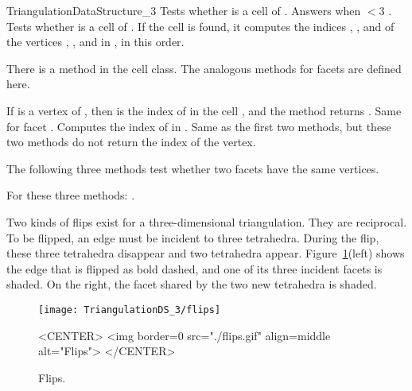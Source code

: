 \begin{ccRefConcept}{TriangulationDataStructure_3}
{Tests whether  is a cell of \ccVar. Answers  when
 $<3$ .}
{Tests whether  is a cell of \ccVar. If the cell
 is found, it computes the indices , , 
and  of the vertices , ,  and  in
, in this order.} 

There is a method  in the cell class. The analogous
methods for facets are defined here.

{If  is a vertex of , then  is the index of
 in the cell , and the method returns .
}
\ccGlue
{}
{Same for facet . Computes the index  of  in
.}
\ccGlue
{}
{}
\ccGlue
{}
{Same as the first two methods, but these two methods do not return the
index of the vertex.}

The following three methods test whether two facets have the same
vertices.

{}
\ccGlue
{}
{}
\ccGlue
{}
{For these three methods: .}


Two kinds of flips exist for a three-dimensional triangulation. They
are reciprocal. To be flipped, an edge must be incident to three
tetrahedra. During the flip, these three tetrahedra disappear and two
tetrahedra appear. Figure~\ref{TDS3-fig-flips}(left) shows the
edge that is flipped as bold dashed, and one of its three incident
facets is shaded. On the right, the facet shared by the two new
tetrahedra is shaded. 


\begin{figure}
\begin{ccTexOnly}
\begin{center} 
\texttt{[image: TriangulationDS\_3/flips]}
\end{center}
\end{ccTexOnly}
\caption{Flips.
\label{TDS3-fig-flips}}
\begin{ccHtmlOnly}
<CENTER>
<img border=0 src="./flips.gif" align=middle alt="Flips">
</CENTER>
\end{ccHtmlOnly}
\end{figure} 


\end{ccRefConcept}
